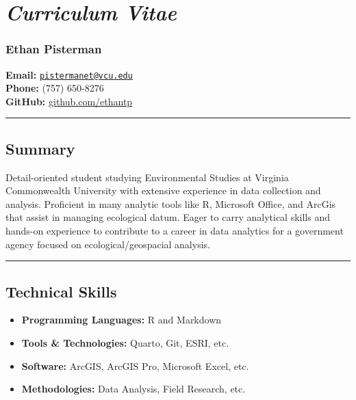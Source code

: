 \documentclass[
  letterpaper,
  DIV=11,
  numbers=noendperiod]{scrartcl}
\author{}
\date{}
\providecommand{\tightlist}{%
  \setlength{\itemsep}{0pt}\setlength{\parskip}{0pt}}\usepackage{longtable,booktabs,array}
\begin{document}
\section{\texorpdfstring{\emph{Curriculum
Vitae}}{Curriculum Vitae}}\label{curriculum-vitae}

\subsubsection{Ethan Pisterman}\label{ethan-pisterman}

\textbf{Email:}
\href{mailto:pistermanet@vcu.edu}{\nolinkurl{pistermanet@vcu.edu}}\\
\textbf{Phone:} (757) 650-8276\\
\textbf{GitHub:} \href{https://github.com/ethantp}{github.com/ethantp}

\begin{center}\rule{0.5\linewidth}{0.5pt}\end{center}

\subsection{Summary}\label{summary}

Detail-oriented student studying Environmental Studies at Virginia
Commonwealth University with extensive experience in data collection and
analysis. Proficient in many analytic tools like R, Microsoft Office,
and ArcGis that assist in managing ecological datum. Eager to carry
analytical skills and hands-on experience to contribute to a career in
data analytics for a government agency focused on ecological/geospacial
analysis.

\begin{center}\rule{0.5\linewidth}{0.5pt}\end{center}

\subsection{Technical Skills}\label{technical-skills}

\begin{itemize}
\tightlist
\item
  \textbf{Programming Languages:} R and Markdown
\item
  \textbf{Tools \& Technologies:} Quarto, Git, ESRI, etc.
\item
  \textbf{Software:} ArcGIS, ArcGIS Pro, Microsoft Excel, etc.
\item
  \textbf{Methodologies:} Data Analysis, Field Research, etc.
\end{itemize}
\end{document}
